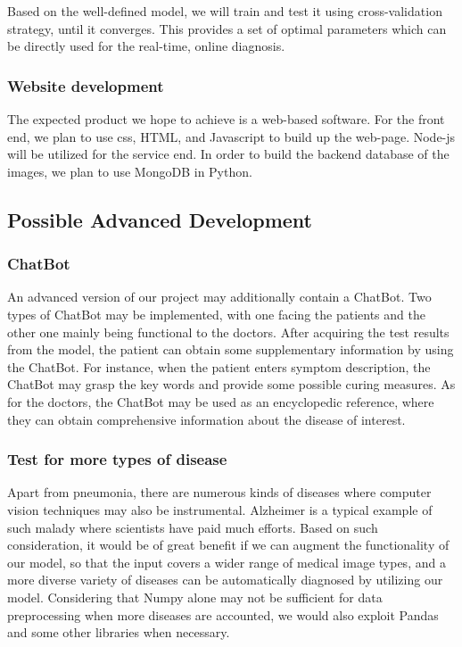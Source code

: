 \documentclass[11pt,bibliography=totocnumbered]{article}
\begin{document}
  Based on the well-defined model, we will train and test it using cross-validation strategy, until it converges. This provides a set of optimal parameters which can be directly used for the real-time, online diagnosis.  
  
  
  \subsubsection{Website development}
  
  The expected product we hope to achieve is a web-based software. For the front end, we plan to use css, HTML, and Javascript to build up the web-page. Node-js will be utilized for the service end. In order to build the backend database of the images, we plan to use MongoDB in Python. 
  
  \subsection{Possible Advanced Development}
  
  \subsubsection{ChatBot}
  
  An advanced version of our project may additionally contain a ChatBot. Two types of ChatBot may be implemented, with one facing the patients and the other one mainly being functional to the doctors. After acquiring the test results from the model, the patient can obtain some supplementary information by using the ChatBot. For instance, when the patient enters symptom description, the ChatBot may grasp the key words and provide some possible curing measures. As for the doctors, the ChatBot may be used as an encyclopedic reference, where they can obtain comprehensive information about the disease of interest. 
  
  \subsubsection{Test for more types of disease}
  
  Apart from pneumonia, there are numerous kinds of diseases where computer vision techniques may also be instrumental. Alzheimer is a typical example of such malady where scientists have paid much efforts. Based on such consideration, it would be of great benefit if we can augment the functionality of our model, so that the input covers a wider range of medical image types, and a more diverse variety of diseases can be automatically diagnosed by utilizing our model. Considering that Numpy alone may not be sufficient for data preprocessing when more diseases are accounted, we would also exploit Pandas and some other libraries when necessary. 
  
\end{document}
